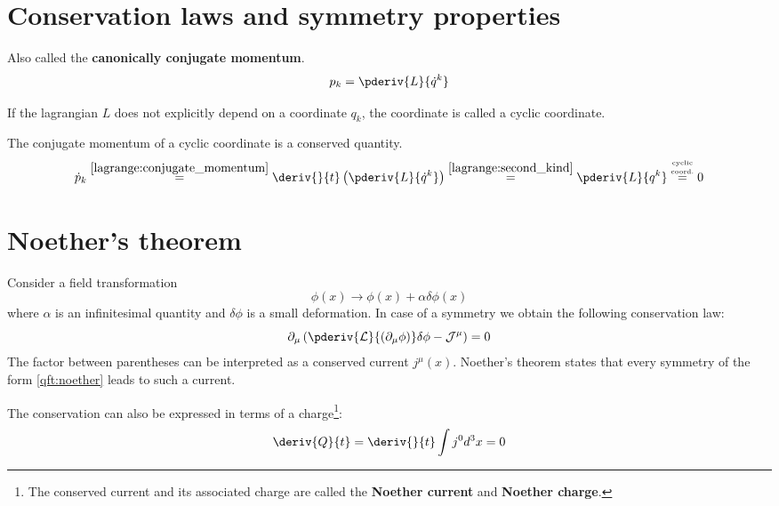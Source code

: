 \section{Conservation laws and symmetry properties}

	\begin{definition}
		Also called the \textbf{canonically conjugate momentum}.
	    	\begin{equation}
			\label{lagrange:conjugate_momentum}
			p_k = \pderiv{L}{\dot{q}^k}
		\end{equation}
	\end{definition}
	\begin{definition}
	    	If the lagrangian $L$ does not explicitly depend on a coordinate $q_k$, the coordinate is called a cyclic coordinate.
	\end{definition}
    
	\begin{property}
		The conjugate momentum of a cyclic coordinate is a conserved quantity.
		\begin{equation}
			\dot{p}_k \overset{\ref{lagrange:conjugate_momentum}}{=} \deriv{}{t}\left(\pderiv{L}{\dot{q}^k}\right) \overset{{\ref{lagrange:second_kind}}}{=}\pderiv{L}{q^k} \overset{\underset{\text{\tiny{coord.}}}{\text{\tiny{cyclic}}}}{=} 0
		\end{equation}
	\end{property}

\section{Noether's theorem}

	\begin{theorem}\label{qft:noethers_theorem}
		Consider a field transformation
		\begin{equation}
			\label{qft:noether}
			\phi(x)\rightarrow \phi(x) + \alpha\delta\phi(x)
		\end{equation}
		where $\alpha$ is an infinitesimal quantity and $\delta\phi$ is a small deformation. In case of a symmetry we obtain the following conservation law:
		 \begin{equation}
		 	\label{qft:conserved_current}
		 	\partial_\mu\left(\pderiv{\mathcal{L}}{(\partial_\mu\phi)}\delta\phi - \mathcal{J}^\mu\right) = 0
		 \end{equation}
		 The factor between parentheses can be interpreted as a conserved current $j^\mu(x)$. Noether's theorem states that every symmetry of the form \ref{qft:noether} leads to such a current.
		 
		 The conservation can also be expressed in terms of a charge\footnote{The conserved current and its associated charge are called the \textbf{Noether current} and \textbf{Noether charge}.}:
		 \begin{equation}
		 	\deriv{Q}{t} = \deriv{}{t}\int j^0d^3x = 0
		 \end{equation}
	\end{theorem}

